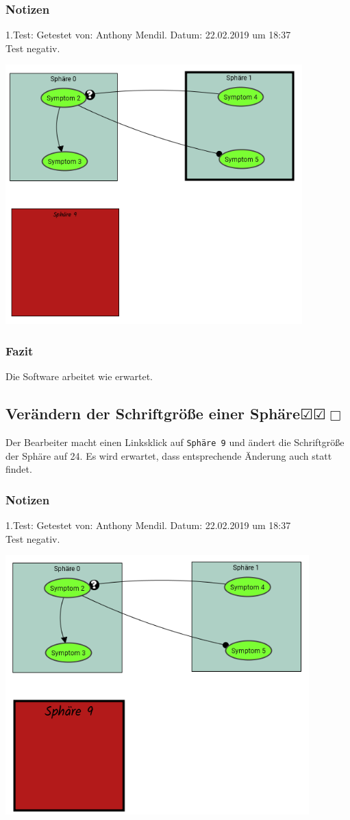 \documentclass{scrartcl}
\newcommand{\subsectiont}[2]{\subsection[#1]{#1{\normalsize\normalfont #2}}}
\newcommand{\leer}{$\Box$}
\newcommand{\ok}{$\CheckedBox$}
\begin{document}
\subsubsection{Notizen}
1.Test: Getestet von: Anthony Mendil. Datum: 22.02.2019 um 18:37 \\
Test negativ.
\begin{center}
\includegraphics[height=10cm]{2_15.PNG}
\end{center}
\subsubsection{Fazit}
Die Software arbeitet wie erwartet.

\subsectiont{Verändern der Schriftgröße einer Sphäre}{\dotfill\ok\ok\leer}
Der Bearbeiter macht einen Linksklick auf \texttt{Sphäre 9} und ändert die Schriftgröße der Sphäre auf 24. Es wird erwartet, dass entsprechende Änderung auch statt findet. 
\subsubsection{Notizen}
1.Test: Getestet von: Anthony Mendil. Datum: 22.02.2019 um 18:37 \\
Test negativ.
\begin{center}
\includegraphics[height=10cm]{2_16.PNG}
\end{center}
\end{document}
